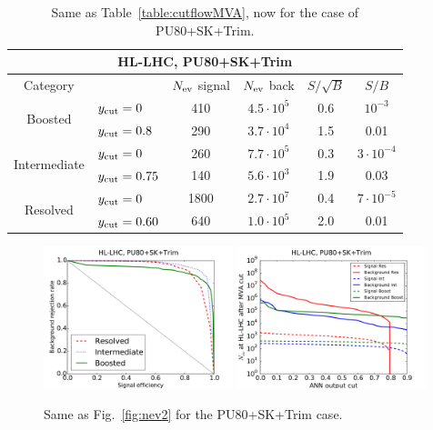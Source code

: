 \begin{table}[t]
  \centering
  \begin{tabular}{|c|l|c|c|c|c|}
        \hline
     \multicolumn{6}{|c|}{HL-LHC, PU80+SK+Trim} \\
     \hline
         \hline
    Category  &   &  $N_{\rm ev}$ signal &  $N_{\rm ev}$ back  &  $S/\sqrt{B}$ & $S/B$ \\ 
    \hline
    \hline
    \multirow{2}{*}{Boosted} &  $y_{\rm cut}=0$  & 410   &  $4.5\cdot 10^5$ & 0.6   & $ 10^{-3}$  \\
    &  $y_{\rm cut}=0.8$ &  290  & $3.7\cdot 10^4$  & 1.5    & 0.01  \\
    \hline
    \hline
    \multirow{2}{*}{Intermediate} &  $y_{\rm cut}=0$  &  260  & $7.7\cdot 10^5$    & 0.3    &
     $3\cdot 10^{-4}$ \\
    &  $y_{\rm cut}=0.75$ & 140 & $5.6\cdot 10^3$  &  1.9   & 0.03 \\
    \hline
    \hline
    \multirow{2}{*}{Resolved} &  $y_{\rm cut}=0$  &  1800  & $2.7\cdot 10^7$
    & 0.4    &  $7\cdot 10^{-5}$  \\
    &  $y_{\rm cut}=0.60$ & 640  & $1.0\cdot 10^5$  &  2.0   & 0.01  \\
    \hline
      \end{tabular}
  \caption{\small Same as Table~\ref{table:cutflowMVA}, now for the case
    of PU80+SK+Trim.
        \label{table:cutflowMVA_PU}
  }
\end{table}

\begin{figure}[t]
  \begin{center}
    \includegraphics[width=0.49\textwidth]{plots/roc_SKPU80.pdf}
\includegraphics[width=0.49\textwidth]{plots/nev2_SKPU80.pdf}
\caption{\small Same as Fig.~\ref{fig:nev2}
 for
 the PU80+SK+Trim case.
\label{fig:nev2_PU}}
\end{center}
\end{figure}

